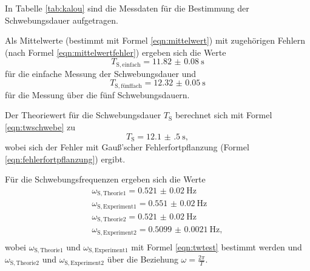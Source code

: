 In Tabelle \ref{tab:kalou} sind die Messdaten für die Bestimmung der Schwebungsdauer
aufgetragen.

Als Mittelwerte (bestimmt mit Formel \eqref{eqn:mittelwert}) mit zugehörigen Fehlern (nach
Formel \eqref{eqn:mittelwertfehler}) ergeben sich die Werte
\begin{equation*}
	T_{\mathrm{S,einfach}} = \SI{11.82(8)}{\second}
\end{equation*}
für die einfache Messung der Schwebungsdauer und
\begin{equation*}
	T_{\mathrm{S,fünffach}} = \SI{12.32(5)}{\second}
\end{equation*}
für die Messung über die fünf Schwebungsdauern.

Der Theoriewert für die Schwebungsdauer $T_{\mathrm{S}}$ berechnet sich mit Formel
\eqref{eqn:twschwebe} zu
\begin{equation*}
	T_{\mathrm{S}} = \SI{12.1(5)}{\second} \mathrm{,}
\end{equation*}
wobei sich der Fehler mit Gauß'scher Fehlerfortpflanzung (Formel \eqref{eqn:fehlerfortpflanzung})
ergibt.

Für die Schwebungsfrequenzen ergeben sich die Werte
\begin{gather*}
	\omega_{\mathrm{S,Theorie1}} = \SI{0.521(20)}{\hertz} \\
	\omega_{\mathrm{S,Experiment1}} = \SI{0.551(20)}{\hertz} \\
	\omega_{\mathrm{S,Theorie2}} = \SI{0.521(20)}{\hertz} \\
	\omega_{\mathrm{S,Experiment2}} = \SI{0.5099(21)}{\hertz} \mathrm{,} \\
\end{gather*}
wobei $\omega_{\mathrm{S,Theorie1}}$ und $\omega_{\mathrm{S,Experiment1}}$ mit Formel
\eqref{eqn:twtest} bestimmt werden und $\omega_{\mathrm{S,Theorie2}}$ und
$\omega_{\mathrm{S,Experiment2}}$ über die Beziehung $\omega = \frac{2\pi}{T}$.
